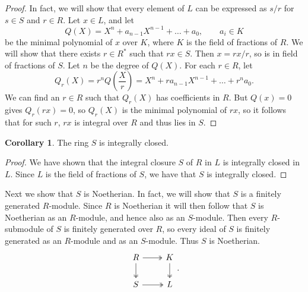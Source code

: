 \documentclass{article}
\newcommand{\rb}[1]{\left( #1 \right)}
\theoremstyle{definition}\newtheorem{definition}{Definition}[subsection]
\theoremstyle{definition}\newtheorem{remark}[definition]{Remark}
\theoremstyle{definition}\newtheorem*{example}{Example}
\theoremstyle{definition}\newtheorem*{note}{Note}
\newtheorem{corollary}[definition]{Corollary}
\begin{document}
\begin{proof}
In fact, we will show that every element of $ L $ can be expressed as $ s / r $ for $ s \in S $ and $ r \in R $. Let $ x \in L $, and let
$$ Q\rb{X} = X^n + a_{n - 1}X^{n - 1} + \dots + a_0, \qquad a_i \in K $$
be the minimal polynomial of $ x $ over $ K $, where $ K $ is the field of fractions of $ R $. We will show that there exists $ r \in R^* $ such that $ rx \in S $. Then $ x = rx / r $, so is in field of fractions of $ S $. Let $ n $ be the degree of $ Q\rb{X} $. For each $ r \in R $, let
$$ Q_r\rb{X} = r^nQ\rb{\dfrac{X}{r}} = X^n + ra_{n - 1}X^{n - 1} + \dots + r^na_0. $$
We can find an $ r \in R $ such that $ Q_r\rb{X} $ has coefficients in $ R $. But $ Q\rb{x} = 0 $ gives $ Q_r\rb{rx} = 0 $, so $ Q_r\rb{X} $ is the minimal polynomial of $ rx $, so it follows that for such $ r $, $ rx $ is integral over $ R $ and thus lies in $ S $.
\end{proof}

\begin{corollary}
The ring $ S $ is integrally closed.
\end{corollary}

\begin{proof}
We have shown that the integral closure $ S $ of $ R $ in $ L $ is integrally closed in $ L $. Since $ L $ is the field of fractions of $ S $, we have that $ S $ is integrally closed.
\end{proof}

Next we show that $ S $ is Noetherian. In fact, we will show that $ S $ is a finitely generated $ R $-module. Since $ R $ is Noetherian it will then follow that $ S $ is Noetherian as an $ R $-module, and hence also as an $ S $-module. Then every $ R $-submodule of $ S $ is finitely generated over $ R $, so every ideal of $ S $ is finitely generated as an $ R $-module and as an $ S $-module. Thus $ S $ is Noetherian.
$$
\begin{tikzcd}
R \arrow[twoheadrightarrow]{r} \arrow[twoheadrightarrow]{d} & K \arrow[twoheadrightarrow]{d} \\
S \arrow[twoheadrightarrow]{r} & L
\end{tikzcd}.
$$

\end{document}
